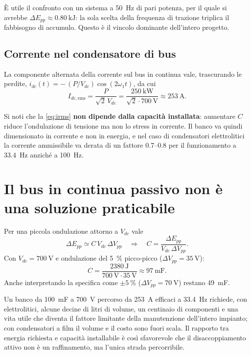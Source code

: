 \documentclass[11pt,a4paper]{article}
\begin{document}
È utile il confronto con un sistema a \SI{50}{\hertz} di pari potenza, per il quale si
avrebbe $\Delta E_{pp}\approx\SI{0.80}{\kilo\joule}$: la sola scelta della frequenza di
trazione triplica il fabbisogno di accumulo. Questo è il vincolo dominante dell'intero
progetto.

\subsection{Corrente nel condensatore di bus}

La componente alternata della corrente sul bus in continua vale, trascurando le perdite,
$i_{dc}(t) = -\,(P/V_{dc})\cos(2\omega_1 t)$, da cui
\begin{equation}
I_{dc,\mathrm{rms}} = \frac{P}{\sqrt{2}\,V_{dc}}
= \frac{\SI{250}{\kilo\watt}}{\sqrt{2}\cdot\SI{700}{\volt}}
\approx \SI{253}{\ampere}.
\label{eq:irms}
\end{equation}

Si noti che la \eqref{eq:irms} \textbf{non dipende dalla capacità installata}: aumentare
$C$ riduce l'ondulazione di tensione ma non lo stress in corrente. Il banco va quindi
dimensionato in corrente e non in energia, e nel caso di condensatori elettrolitici la
corrente ammissibile va derata di un fattore \num{0.7}--\num{0.8} per il funzionamento a
\SI{33.4}{\hertz} anziché a \SI{100}{\hertz}.

\section{Il bus in continua passivo non è una soluzione praticabile}

Per una piccola ondulazione attorno a $V_{dc}$ vale
\begin{equation}
\Delta E_{pp} \simeq C\, V_{dc}\, \Delta V_{pp}
\quad\Longrightarrow\quad
C = \frac{\Delta E_{pp}}{V_{dc}\,\Delta V_{pp}} .
\label{eq:capacita}
\end{equation}
Con $V_{dc}=\SI{700}{\volt}$ e ondulazione del \SI{5}{\percent} picco-picco
($\Delta V_{pp}=\SI{35}{\volt}$):
\begin{equation}
C = \frac{\SI{2380}{\joule}}{\SI{700}{\volt}\cdot\SI{35}{\volt}} \approx \SI{97}{\milli\farad}.
\end{equation}
Anche interpretando la specifica come $\pm\SI{5}{\percent}$ ($\Delta V_{pp}=\SI{70}{\volt}$)
restano \SI{49}{\milli\farad}.

Un banco da \SI{100}{\milli\farad} a \SI{700}{\volt} percorso da \SI{253}{\ampere} efficaci
a \SI{33.4}{\hertz} richiede, con elettrolitici, alcune decine di litri di volume, un
centinaio di componenti e una vita utile che diventa il fattore limitante della
manutenzione dell'intero impianto; con condensatori a film il volume e il costo sono
fuori scala. Il rapporto tra energia richiesta e capacità installabile è così sfavorevole
che il disaccoppiamento attivo non è un raffinamento, ma l'unica strada percorribile.
\end{document}

